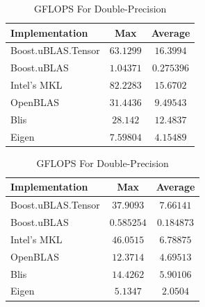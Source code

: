 \begin{table}[ht]
    \centering
    \caption{GFLOPS For Single-Precision}
    \begin{tabular}{|l|c|c|}
        \hline
        \textbf{Implementation} & \textbf{Max} & \textbf{Average}\\
        \hline
        Boost.uBLAS.Tensor  & $63.1299$& $16.3994$ \\
        \hline
        Boost.uBLAS         & $1.04371$& $0.275396$ \\
        \hline
        Intel's MKL         & $82.2283$& $15.6702$ \\
        \hline
        OpenBLAS            & $31.4436$& $9.49543$ \\
        \hline
        Blis                & $28.142$& $12.4837$ \\
        \hline
        Eigen               & $7.59804$& $4.15489$ \\
        \hline
    \end{tabular}

    \vspace*{1 cm}

    \centering
    \caption{GFLOPS For Double-Precision}
    \begin{tabular}{|l|c|c|}
        \hline
        \textbf{Implementation} & \textbf{Max} & \textbf{Average}\\
        \hline
        Boost.uBLAS.Tensor  & $37.9093$ & $7.66141$ \\
        \hline
        Boost.uBLAS         & $0.585254$ & $0.184873$ \\
        \hline
        Intel's MKL         & $46.0515$ & $6.78875$ \\
        \hline
        OpenBLAS            & $12.3714$ & $4.69513$ \\
        \hline
        Blis                & $14.4262$ & $5.90106$ \\
        \hline
        Eigen               & $5.1347$ & $2.0504$ \\
        \hline
    \end{tabular}
\end{table}

